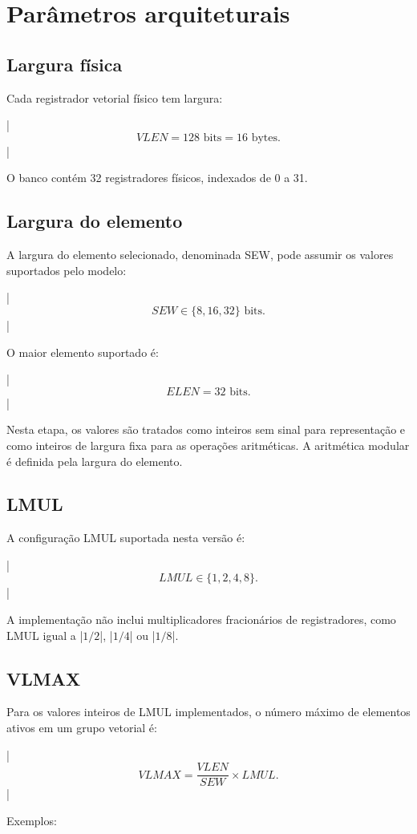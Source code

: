 \section{Parâmetros arquiteturais}

\subsection{Largura física}

Cada registrador vetorial físico tem largura:

|$$
VLEN = 128 \text{ bits} = 16 \text{ bytes}.
$$|

O banco contém 32 registradores físicos, indexados de 0 a 31.

\subsection{Largura do elemento}

A largura do elemento selecionado, denominada SEW, pode assumir os
valores suportados pelo modelo:

|$$
SEW \in \{8,16,32\} \text{ bits}.
$$|

O maior elemento suportado é:

|$$
ELEN = 32 \text{ bits}.
$$|

Nesta etapa, os valores são tratados como inteiros sem sinal para
representação e como inteiros de largura fixa para as operações
aritméticas. A aritmética modular é definida pela largura do elemento.

\subsection{LMUL}

A configuração LMUL suportada nesta versão é:

|$$
LMUL \in \{1,2,4,8\}.
$$|

A implementação não inclui multiplicadores fracionários de registradores,
como LMUL igual a |$1/2$|, |$1/4$| ou |$1/8$|.

\subsection{VLMAX}

Para os valores inteiros de LMUL implementados, o número máximo de
elementos ativos em um grupo vetorial é:

|$$
VLMAX = \frac{VLEN}{SEW} \times LMUL.
$$|

Exemplos:

